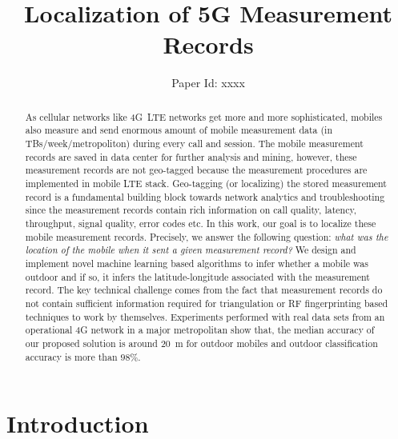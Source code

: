\documentclass[conference, 10pt]{IEEEtran}
\title{Localization of 5G Measurement Records}
\author{Paper Id: xxxx}
\begin{document}
\maketitle


\begin{abstract}

As cellular networks like 4G~LTE networks get more and more sophisticated, mobiles
also measure and send enormous amount of mobile measurement data (in
TBs/week/metropoliton) during every call and session. The mobile measurement records
are saved in data center for further analysis and mining, however, these measurement
records are not geo-tagged because the measurement procedures are implemented in
mobile LTE stack. Geo-tagging (or localizing) the stored measurement record is a
fundamental building block towards network analytics and troubleshooting since the
measurement records contain  rich information on call quality, latency, throughput,
signal quality, error codes etc. In this work, our goal is to localize these mobile
measurement records. Precisely, we answer the following question: {\em what was the
location of the mobile when it sent a given measurement record?} We design and
implement novel machine learning based algorithms to infer whether a mobile was
outdoor and if so, it infers the latitude-longitude associated with the measurement
record. The key technical challenge comes from the fact that measurement records do
not contain sufficient information required for triangulation or RF fingerprinting
based techniques to work by themselves. Experiments performed with real data sets
from an operational 4G network in a major metropolitan show that, the median accuracy
of our proposed solution is around 20~m for outdoor mobiles and outdoor
classification accuracy is more than $98\%$.

\end{abstract}


\section{Introduction}


\end{document}
